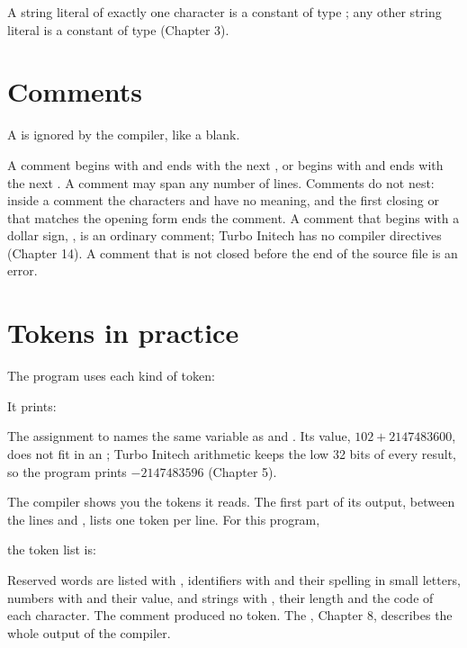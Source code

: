 A string literal of exactly one character is a constant of type ;
any other string literal is a constant of type  (Chapter 3).

\section{Comments}
A  is ignored by the compiler, like a blank.


A comment begins with \code{\{} and ends with the next \code{\}}, or begins
with \code{(*} and ends with the next \code{*)}.  A comment may span any
number of lines.  Comments do not nest: inside a comment the characters
\code{\{} and \code{(*} have no meaning, and the first closing \code{\}} or
\code{*)} that matches the opening form ends the comment.  A comment that
begins with a dollar sign, \code{\{\$}, is an ordinary comment; Turbo
Initech has no compiler directives (Chapter 14).  A comment that is not
closed before the end of the source file is an error.

\section{Tokens in practice}
The program  uses each kind of token:


It prints:


The assignment to  names the same variable as  and
.  Its value, $102 + 2147483600$, does not fit in an
; Turbo Initech arithmetic keeps the low 32 bits of every
result, so the program prints $-2147483596$ (Chapter 5).

The compiler shows you the tokens it reads.  The first part of its output,
between the lines  and , lists one token
per line.  For this program,


the token list is:


Reserved words are listed with , identifiers with  and
their spelling in small letters, numbers with  and their value,
and strings with , their length and the code of each character.
The comment produced no token.  The , Chapter 8,
describes the whole output of the compiler.
